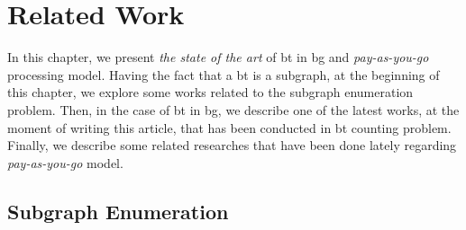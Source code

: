 \chapter{Related Work}\label{relate-work}
In this chapter, we present \emph{the state of the art} of \acrlong{bt} in \acrlong{bg} and \emph{pay-as-you-go} processing model.
Having the fact that a \acrshort{bt} is a subgraph, at the beginning of this chapter, we explore some works related to the subgraph enumeration problem. 
Then, in the case of \acrshort{bt} in \acrshort{bg}, we describe one of the latest works, at the moment of writing this article, that has been conducted in \acrshort{bt} counting problem.
Finally, we describe some related researches that have been done lately regarding \emph{pay-as-you-go} model.

\section{Subgraph Enumeration}\label{sec:rel-work:subgraph}
